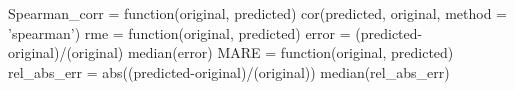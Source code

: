 Spearman\_corr = function(original, predicted){
  cor(predicted, original, method = 'spearman')
}
rme = function(original, predicted){
  error = (predicted-original)/(original)
  median(error)
}
MARE = function(original, predicted){
  rel_abs_err = abs((predicted-original)/(original))
  median(rel_abs_err)
}